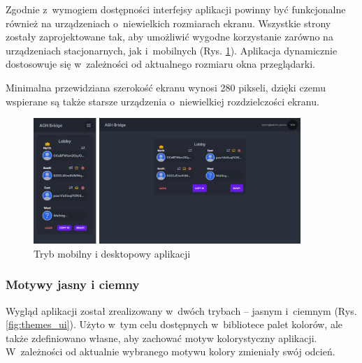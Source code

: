 Zgodnie z~wymogiem dostępności interfejsy aplikacji powinny
być funkcjonalne również na urządzeniach o~niewielkich
rozmiarach ekranu. Wszystkie strony zostały zaprojektowane
tak, aby umożliwić wygodne korzystanie zarówno na urządzeniach
stacjonarnych, jak i~mobilnych (Rys. \ref{fig:responsive_ui}). Aplikacja dynamicznie
dostosowuje się w~zależności od aktualnego rozmiaru okna
przeglądarki.

Minimalna przewidziana
szerokość ekranu wynosi 280 pikseli, dzięki czemu wspierane
są także starsze urządzenia o~niewielkiej rozdzielczości
ekranu.

\begin{figure}[h!]
  \centering
  \includegraphics[width=0.9\textwidth]{img/widoki/desktop_mobile.png}
  \caption{Tryb mobilny i desktopowy aplikacji}
  \label{fig:responsive_ui}
\end{figure}

\FloatBarrier

\subsubsection{Motywy jasny i ciemny}

Wygląd aplikacji został zrealizowany w~dwóch trybach --
jasnym i~ciemnym (Rys. \ref{fig:themes_ui}). Użyto w~tym celu dostępnych w~bibliotece
palet kolorów, ale także zdefiniowano własne, aby zachować
motyw kolorystyczny aplikacji. W~zależności od aktualnie
wybranego motywu kolory zmieniały swój odcień.



